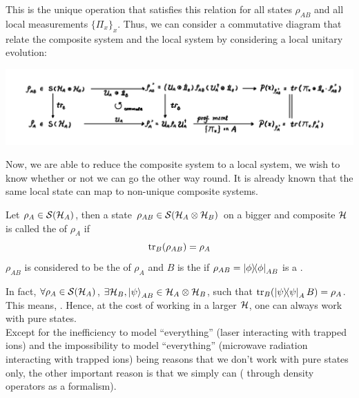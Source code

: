 This is the unique operation that satisfies this relation for all states $\rho_{AB}$ and all local measurements $\{\Pi_x\}_x$. Thus, we can consider a commutative diagram that relate the composite system and the local system by considering a local unitary evolution:
\begin{center}
    \includegraphics[scale = 0.625]{partial-trace.png}
\end{center}
Now, we are able to reduce the composite system to a local system, we wish to know whether or not we can go the other way round. It is already known that the same local state can map to non-unique composite systems.
\begin{definition}
    Let $\rho_A \in \mathcal{S}(\mathcal{H}_A)$, then a state $\rho_{AB} \in \mathcal{S}(\mathcal{H}_A \otimes \mathcal{H}_B)$ on a bigger and composite $\mathcal{H}$ is called the  of $\rho_A$ if
    $$\tr_B(\rho_{AB}) = \rho_A$$
    $\rho_{AB}$ is considered to be the  of $\rho_A$ and $B$ is the  if $\rho_{AB} = \dyad{\phi}_{AB}$ is a .
\end{definition}
In fact, $\forall \rho_A \in \mathcal{S}(\mathcal{H}_A)$, $\exists \mathcal{H}_B, \ket{\psi}_{AB} \in \mathcal{H}_A \otimes \mathcal{H}_B$, such that $\tr_B(\dyad{\psi}_AB) = \rho_A$. This means, . Hence, at the cost of working in a larger $\mathcal{H}$, one can always work with pure states. \\
Except for the inefficiency to model ``everything'' (laser interacting with trapped ions) and the impossibility to model ``everything'' (microwave radiation interacting with trapped ions) being reasons that we don't work with pure states only, the other important reason is that we simply can ( through density operators as a formalism).

